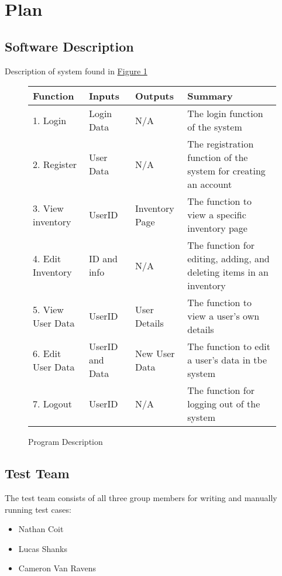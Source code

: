 \documentclass[12pt, titlepage]{article}
\begin{document}
\section{Plan}
\label{sec:plan}
	
\subsection{Software Description}
Description of system found in \hyperref[fig:table1]{Figure 1}
\begin{figure}[h]
\centering
\begin{tabular}{| p{4cm} | p{3.2cm} | p{3cm} | p{5cm} |}
\hline
\textbf{Function} & \textbf{Inputs} & \textbf{Outputs} & \textbf{Summary}\\
\hline
1. Login & Login Data & N/A & The login function of the system \\ \hline

2. Register & User Data & N/A & The registration function of the system for creating an account\\ \hline

3. View inventory & UserID & Inventory Page & The function to view a specific inventory page\\ \hline

4. Edit Inventory & ID and info & N/A & The function for editing, adding, and deleting items in an inventory\\ \hline

5. View User Data & UserID & User Details & The function to view a user's own details\\ \hline

6. Edit User Data & UserID and Data & New User Data & The function to edit a user's data in tbe system\\ \hline

7. Logout & UserID & N/A & The function for logging out of the system\\ \hline

\end{tabular}

\caption{Program Description}
\label{fig:table1}

\end{figure}



\subsection{Test Team}
The test team consists of all three group members for writing and manually running test cases:
\begin{itemize}
    \item Nathan Coit
    \item Lucas Shanks
    \item Cameron Van Ravens
\end{itemize}
\end{document}
